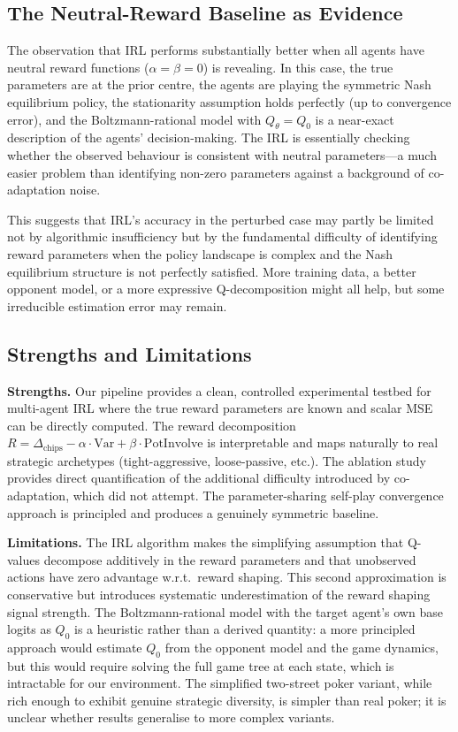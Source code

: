 \documentclass{article}
\begin{document}
\subsection{The Neutral-Reward Baseline as Evidence}

The observation that IRL performs substantially better when all agents have neutral reward functions ($\alpha = \beta = 0$) is revealing. In this case, the true parameters are at the prior centre, the agents are playing the symmetric Nash equilibrium policy, the stationarity assumption holds perfectly (up to convergence error), and the Boltzmann-rational model with $Q_\theta = Q_0$ is a near-exact description of the agents' decision-making. The IRL is essentially checking whether the observed behaviour is consistent with neutral parameters---a much easier problem than identifying non-zero parameters against a background of co-adaptation noise.

This suggests that IRL's accuracy in the perturbed case may partly be limited not by algorithmic insufficiency but by the fundamental difficulty of identifying reward parameters when the policy landscape is complex and the Nash equilibrium structure is not perfectly satisfied. More training data, a better opponent model, or a more expressive Q-decomposition might all help, but some irreducible estimation error may remain.

\subsection{Strengths and Limitations}

\textbf{Strengths.} Our pipeline provides a clean, controlled experimental testbed for multi-agent IRL where the true reward parameters are known and scalar MSE can be directly computed. The reward decomposition $R = \Delta_{\text{chips}} - \alpha \cdot \text{Var} + \beta \cdot \text{PotInvolve}$ is interpretable and maps naturally to real strategic archetypes (tight-aggressive, loose-passive, etc.). The ablation study provides direct quantification of the additional difficulty introduced by co-adaptation, which \citet{fu2021evaluating} did not attempt. The parameter-sharing self-play convergence approach is principled and produces a genuinely symmetric baseline.

\textbf{Limitations.} The IRL algorithm makes the simplifying assumption that Q-values decompose additively in the reward parameters and that unobserved actions have zero advantage w.r.t.\ reward shaping. This second approximation is conservative but introduces systematic underestimation of the reward shaping signal strength. The Boltzmann-rational model with the target agent's own base logits as $Q_0$ is a heuristic rather than a derived quantity: a more principled approach would estimate $Q_0$ from the opponent model and the game dynamics, but this would require solving the full game tree at each state, which is intractable for our environment. The simplified two-street poker variant, while rich enough to exhibit genuine strategic diversity, is simpler than real poker; it is unclear whether results generalise to more complex variants.
\end{document}
